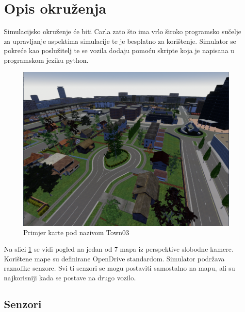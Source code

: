 \section{Opis okruženja}

Simulacijsko okruženje će biti Carla zato što ima vrlo široko programsko sučelje za upravljanje aspektima simulacije te je besplatno za korištenje. Simulator se pokreće kao poslužitelj te se vozila dodaju pomoću skripte koja je napisana u programskom jeziku python.

\begin{figure}[ht!]
  \centering
  \includegraphics[scale=0.5]{images/carla_town03_example.png}
  \caption{Primjer karte pod nazivom Town03}
  \label{fig:town03_exmaple}
\end{figure}

Na slici \ref{fig:town03_exmaple} se vidi pogled na jedan od 7 mapa iz perspektive slobodne kamere. Korištene mape su definirane OpenDrive standardom. Simulator podržava raznolike senzore. Svi ti senzori se mogu postaviti samostalno na mapu, ali su najkorisniji kada se postave na drugo vozilo.

\newpage
\subsection{Senzori}
